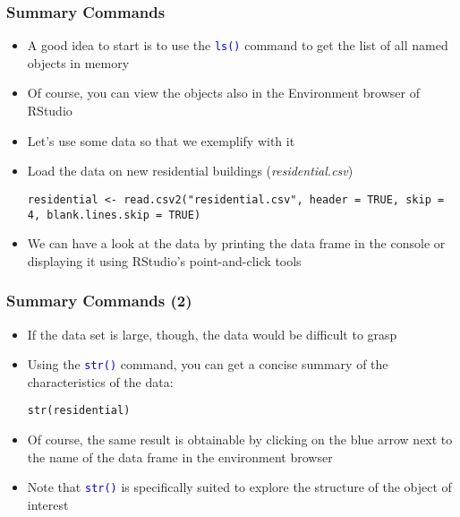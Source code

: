 \documentclass[10pt]{beamer}
\newcommand{\cc}[1]{\texttt{\textcolor{blue}{#1}}}
\theoremstyle{definition}
\begin{document}
\begin{frame}[fragile]
\frametitle{Summary Commands}
\begin{itemize}
	\item A good idea to start is to use the \cc{ls()} command to get the list of all named objects in memory
	
	\item Of course, you can view the objects also in the Environment browser of RStudio
	
	\item Let's use some data so that we exemplify with it
	
	\item Load the data on new residential buildings (\emph{residential.csv})
	\begin{lstlisting}[style = rstyle, breaklines]
	residential <- read.csv2("residential.csv", header = TRUE, skip = 4, blank.lines.skip = TRUE)
	\end{lstlisting}

	\item We can have a look at the data by printing the data frame in the console or displaying it using RStudio's point-and-click tools
\end{itemize}
\end{frame}

\begin{frame}[fragile]
\frametitle{Summary Commands (2)}
\begin{itemize}
	\item If the data set is large, though, the data would be difficult to grasp
	
	\item Using the \cc{str()} command, you can get a concise summary of the characteristics of the data:
	\begin{lstlisting}[style = rstyle, breaklines]
	str(residential)
	\end{lstlisting}
	
	\item Of course, the same result is obtainable by clicking on the blue arrow next to the name of the data frame in the environment browser
	
	\item Note that \cc{str()} is specifically suited to explore the structure of the object of interest
\end{itemize}
\end{frame}
\end{document}
